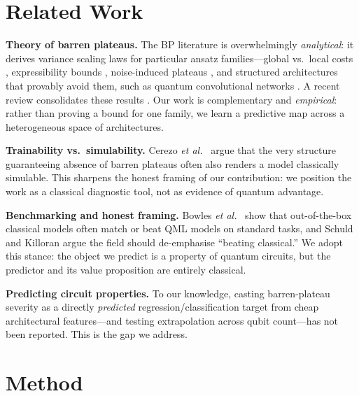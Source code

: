 \documentclass[journal]{IEEEtran}
\begin{document}
\section{Related Work}
\textbf{Theory of barren plateaus.} The BP literature is overwhelmingly
\emph{analytical}: it derives variance scaling laws for particular ansatz
families---global vs.\ local costs \cite{cerezo2021cost}, expressibility bounds
\cite{holmes2022expressibility}, noise-induced plateaus \cite{wang2021noise},
and structured architectures that provably avoid them, such as quantum
convolutional networks \cite{pesah2021absence}. A recent review consolidates
these results \cite{larocca2025barren}. Our work is complementary and
\emph{empirical}: rather than proving a bound for one family, we learn a
predictive map across a heterogeneous space of architectures.

\textbf{Trainability vs.\ simulability.} Cerezo \emph{et al.}\
\cite{cerezo2025simulability} argue that the very structure guaranteeing absence
of barren plateaus often also renders a model classically simulable. This
sharpens the honest framing of our contribution: we position the work as a
classical diagnostic tool, not as evidence of quantum advantage.

\textbf{Benchmarking and honest framing.} Bowles \emph{et al.}\
\cite{bowles2024benchmarking} show that out-of-the-box classical models often
match or beat QML models on standard tasks, and Schuld and Killoran
\cite{schuld2022killoran} argue the field should de-emphasise ``beating
classical.'' We adopt this stance: the object we predict is a property of quantum
circuits, but the predictor and its value proposition are entirely classical.

\textbf{Predicting circuit properties.} To our knowledge, casting barren-plateau
severity as a directly \emph{predicted} regression/classification target from
cheap architectural features---and testing extrapolation across qubit count---has
not been reported. This is the gap we address.

\section{Method}
\end{document}
